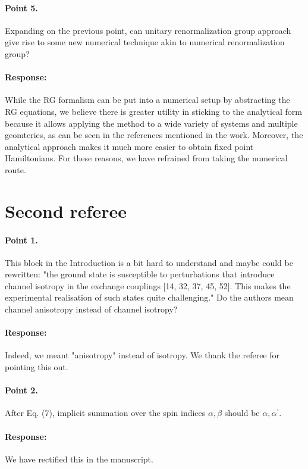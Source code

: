 \documentclass[11pt]{article}
\begin{document}
\paragraph{Point 5.}
Expanding on the previous point, can unitary renormalization group approach give rise to some new numerical technique akin to numerical renormalization group?

{\color{blue}\paragraph{Response:} While the RG formalism can be put into a numerical setup by abstracting the RG equations, we believe there is greater utility in sticking to the analytical form because it allows applying the method to a wide variety of systems and multiple geomteries, as can be seen in the references mentioned in the work. Moreover, the analytical approach makes it much more easier to obtain fixed point Hamiltonians. For these reasons, we have refrained from taking the numerical route.}

\section{Second referee}

\paragraph{Point 1.}
This block in the Introduction is a bit hard to understand and maybe could be rewritten: "the ground state is susceptible to perturbations that introduce channel isotropy in the exchange couplings [14, 32, 37, 45, 52]. This makes the experimental realisation of such states quite challenging." Do the authors mean channel anisotropy instead of channel isotropy?

{\color{blue}\paragraph{Response:} Indeed, we meant "anisotropy" instead of isotropy. We thank the referee for pointing this out.}

\paragraph{Point 2.} 
After Eq. (7), implicit summation over the spin indices $\alpha,\beta$ should be $\alpha,\alpha^\prime$.

{\color{blue}\paragraph{Response:} We have rectified this in the manuscript.}
\end{document}
